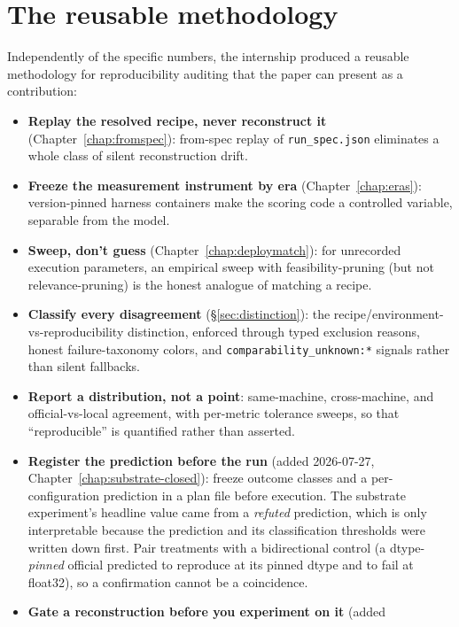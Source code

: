 \documentclass[11pt]{report}
\newcommand{\code}[1]{\texttt{#1}}
\newcommand{\file}[1]{\texttt{#1}}
\begin{document}
\section{The reusable methodology}

Independently of the specific numbers, the internship produced a reusable
methodology for reproducibility auditing that the paper can present as a
contribution:

\begin{itemize}[nosep]
  \item \textbf{Replay the resolved recipe, never reconstruct it}
        (Chapter~\ref{chap:fromspec}): from-spec replay of \file{run\_spec.json}
        eliminates a whole class of silent reconstruction drift.
  \item \textbf{Freeze the measurement instrument by era}
        (Chapter~\ref{chap:eras}): version-pinned harness containers make the
        scoring code a controlled variable, separable from the model.
  \item \textbf{Sweep, don't guess} (Chapter~\ref{chap:deploymatch}): for unrecorded
        execution parameters, an empirical sweep with feasibility-pruning (but not
        relevance-pruning) is the honest analogue of matching a recipe.
  \item \textbf{Classify every disagreement} (\S\ref{sec:distinction}): the
        recipe/environment-vs-reproducibility distinction, enforced through typed
        exclusion reasons, honest failure-taxonomy colors, and
        \code{comparability\_unknown:*} signals rather than silent fallbacks.
  \item \textbf{Report a distribution, not a point}: same-machine, cross-machine,
        and official-vs-local agreement, with per-metric tolerance sweeps, so that
        ``reproducible'' is quantified rather than asserted.
  \item \textbf{Register the prediction before the run} (added 2026-07-27,
        Chapter~\ref{chap:substrate-closed}): freeze outcome classes and a
        per-configuration prediction in a plan file before execution. The
        substrate experiment's headline value came from a \emph{refuted} prediction,
        which is only interpretable because the prediction and its classification
        thresholds were written down first. Pair treatments with a bidirectional
        control (a dtype-\emph{pinned} official predicted to reproduce at its pinned
        dtype and to fail at float32), so a confirmation cannot be a coincidence.
  \item \textbf{Gate a reconstruction before you experiment on it} (added

\end{itemize}
\end{document}

